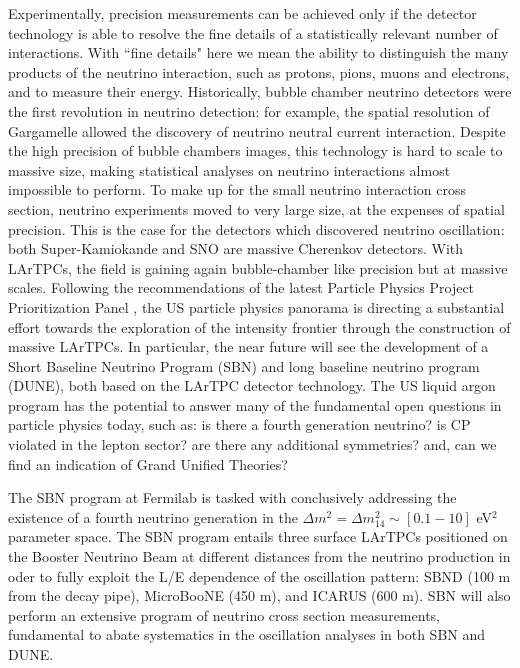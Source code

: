 Experimentally, precision measurements can be achieved only if the detector technology is able to resolve the fine details of a statistically relevant number of interactions. 
With ``fine details" here we mean the ability to distinguish the many products of the neutrino interaction, such as protons, pions, muons and electrons, and to measure their energy.
Historically,  bubble chamber neutrino detectors were the first revolution in neutrino detection: for example, the spatial resolution of Gargamelle allowed the discovery of neutrino neutral current interaction. Despite the high precision of bubble chambers images, this technology is hard to scale to massive size, making statistical analyses on neutrino interactions almost impossible to perform. To make up for the small neutrino interaction cross section, neutrino experiments moved to very large size, at the expenses of spatial precision. This is the case for the detectors which discovered neutrino oscillation:  both Super-Kamiokande and SNO are massive Cherenkov detectors. With LArTPCs, the field is gaining again bubble-chamber like precision but at massive scales. Following the recommendations of  the latest Particle Physics Project Prioritization Panel  \cite{P5}, the US particle physics panorama is directing a substantial effort towards the exploration of the intensity frontier through the construction of massive LArTPCs. In particular, the near future will see the development of a Short Baseline Neutrino Program (SBN) and long baseline neutrino program  (DUNE), both based on the LArTPC detector technology. The US liquid argon program has the potential to answer many of the fundamental open questions in particle physics today, such as: is there a fourth generation neutrino? is CP violated in the lepton sector? are there any additional symmetries? and, can we find an indication of Grand Unified Theories? 

The SBN program at Fermilab is tasked with conclusively addressing the existence of a fourth neutrino generation in the  $\Delta m^2= \Delta m^2_{14} \sim [0.1 - 10]$ eV$^2$ parameter space. The SBN program entails three surface LArTPCs positioned on the Booster Neutrino Beam at different distances from the neutrino production in oder to fully exploit  the L/E dependence of the oscillation pattern:  SBND (100 m from the decay pipe), MicroBooNE (450 m), and ICARUS (600 m). SBN will also perform an extensive 
program of neutrino cross section measurements, fundamental to abate systematics in the oscillation analyses in both SBN and DUNE.


